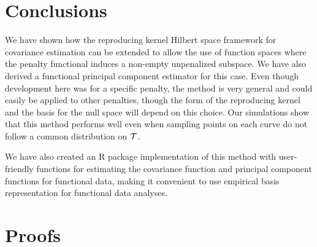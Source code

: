 \section{Conclusions} 

\label{sec:conclusions}

We have shown how the reproducing kernel Hilbert space framework for covariance estimation can be extended to allow the use of function spaces where the penalty functional induces a non-empty unpenalized subspace. We have also derived a functional principal component estimator for this case. Even though development here was for a specific penalty, the method is very general and could easily be applied to other penalties, though the form of the reproducing kernel and the basis for the null space will depend on this choice. Our simulations show that this method performs well even when sampling points on each curve do not follow a common distribution on $\mathcal{T}$. 

We have also created an R package implementation of this method with user-friendly functions for estimating the covariance function and principal component functions for functional data, making it convenient to use empirical basis representation for functional data analyses. 

\section{Proofs} 

\label{sec:proofs}

